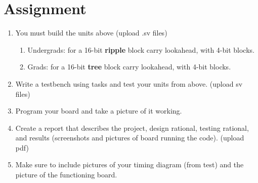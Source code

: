 \section{Assignment}



\begin{enumerate}
\item You must build the units above (upload .sv files)
   \begin{enumerate}
   \item Undergrads: for a 16-bit \textbf{ripple} block carry lookahead, with 4-bit blocks.
   \item Grads: for a 16-bit \textbf{tree} block carry lookahead, with 4-bit blocks.
   \end{enumerate}
\item Write a testbench using tasks and test your units from above. (upload sv files)
\item Program your board and take a picture of it working.
\item  Create a report that describes the project, design rational, testing rational, and results (screenshots and pictures of board running the code). (upload pdf)
\item Make sure to include pictures of your timing diagram (from test) and the picture of the functioning board.
\end{enumerate} 